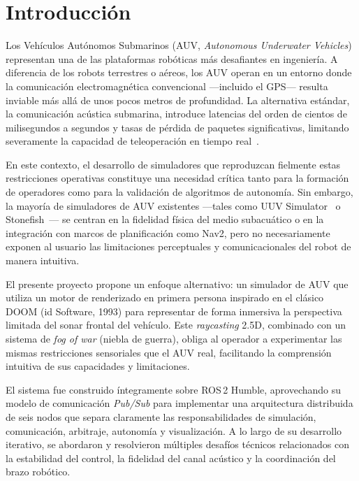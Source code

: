 \documentclass[10pt,twocolumn,letterpaper]{article}
\begin{document}
\section{Introducción}
\label{sec:introduccion}

Los Vehículos Autónomos Submarinos (AUV, \textit{Autonomous Underwater Vehicles}) representan una de las plataformas robóticas más desafiantes en ingeniería. A diferencia de los robots terrestres o aéreos, los AUV operan en un entorno donde la comunicación electromagnética convencional ---incluido el GPS--- resulta inviable más allá de unos pocos metros de profundidad. La alternativa estándar, la comunicación acústica submarina, introduce latencias del orden de cientos de milisegundos a segundos y tasas de pérdida de paquetes significativas, limitando severamente la capacidad de teleoperación en tiempo real~\cite{stojanovic2009}.

En este contexto, el desarrollo de simuladores que reproduzcan fielmente estas restricciones operativas constituye una necesidad crítica tanto para la formación de operadores como para la validación de algoritmos de autonomía. Sin embargo, la mayoría de simuladores de AUV existentes ---tales como UUV Simulator~\cite{uuvsim2016} o Stonefish~\cite{stonefish2020}--- se centran en la fidelidad física del medio subacuático o en la integración con marcos de planificación como Nav2, pero no necesariamente exponen al usuario las limitaciones perceptuales y comunicacionales del robot de manera intuitiva.

El presente proyecto propone un enfoque alternativo: un simulador de AUV que utiliza un motor de renderizado en primera persona inspirado en el clásico DOOM (id Software, 1993) para representar de forma inmersiva la perspectiva limitada del sonar frontal del vehículo. Este \textit{raycasting} 2.5D, combinado con un sistema de \textit{fog of war} (niebla de guerra), obliga al operador a experimentar las mismas restricciones sensoriales que el AUV real, facilitando la comprensión intuitiva de sus capacidades y limitaciones.

El sistema fue construido íntegramente sobre ROS\,2 Humble, aprovechando su modelo de comunicación \textit{Pub/Sub} para implementar una arquitectura distribuida de seis nodos que separa claramente las responsabilidades de simulación, comunicación, arbitraje, autonomía y visualización. A lo largo de su desarrollo iterativo, se abordaron y resolvieron múltiples desafíos técnicos relacionados con la estabilidad del control, la fidelidad del canal acústico y la coordinación del brazo robótico.
\end{document}
